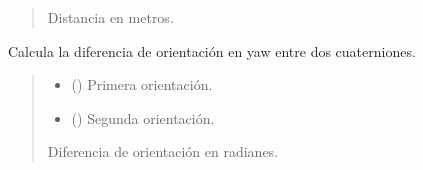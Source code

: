 \documentclass[a4paper,10pt,spanish]{sphinxmanual}
\begin{document}
\begin{fulllineitems}
\begin{fulllineitems}
\begin{quote}
\begin{description}
\begin{itemize}
\end{itemize}

\sphinxAtStartPar
Distancia en metros.

\sphinxAtStartPar
{}

\end{description}\end{quote}

\end{fulllineitems}


\begin{fulllineitems}
\label{\detokenize{squad_approach_control_action:squad_approach_control_action.CheckPositionState.calculate_orientation_diff}}
\pysigstartsignatures
{}
\pysigstopsignatures
\sphinxAtStartPar
Calcula la diferencia de orientación en yaw entre dos cuaterniones.
\begin{quote}\begin{description}
\begin{itemize}
\item {} 
\sphinxAtStartPar
{} () \textendash{} Primera orientación.

\item {} 
\sphinxAtStartPar
{} () \textendash{} Segunda orientación.

\end{itemize}

\sphinxAtStartPar
Diferencia de orientación en radianes.

\sphinxAtStartPar
{}

\end{description}\end{quote}


\end{fulllineitems}
\end{fulllineitems}
\end{document}
